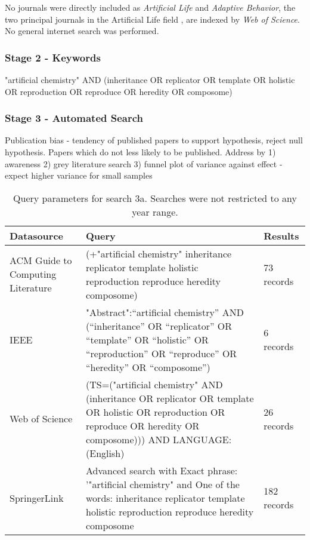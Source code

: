No journals were directly included as \textit{Artificial Life} and \textit{Adaptive Behavior}, the two principal journals in the Artificial Life field \cite{Aicardi2010}, are indexed by \textit{Web of Science}. No general internet search was performed. 

\subsubsection{Stage 2 - Keywords}

"artificial chemistry" AND (inheritance OR replicator OR template OR holistic OR reproduction OR reproduce OR heredity OR composome)

\subsubsection{Stage 3 - Automated Search}

Publication bias - tendency of published papers to support hypothesis, reject null hypothesis. Papers which do not less likely to be published. Address by 1) awareness 2) grey literature search 3) funnel plot of variance against effect - expect higher variance for small samples

\begin{table*}
	\footnotesize
	\begin{center}
		\begin{tabular}{@{}p{2cm}p{2cm}p{9cm}@{}}
			\toprule
			Datasource & Query & Results\\
			\midrule
			ACM Guide to Computing Literature & (+"artificial chemistry" inheritance replicator template holistic reproduction reproduce heredity composome)&73 records\\
			\midrule
			IEEE & "Abstract":“artificial chemistry” AND (“inheritance” OR “replicator” OR “template” OR “holistic” OR “reproduction” OR “reproduce” OR “heredity” OR “composome”)&6 records  \\
			\midrule
			Web of Science & (TS=("artificial chemistry" AND (inheritance OR replicator OR template OR holistic OR reproduction OR reproduce OR heredity OR composome))) AND LANGUAGE: (English)&26 records\\
			\midrule
			SpringerLink & Advanced search with Exact phrase: '"artificial chemistry" and One of the words: inheritance replicator template holistic reproduction reproduce heredity composome & 182 records\\ 
			\bottomrule
		\end{tabular}
	\end{center}
	\caption{Query parameters for search 3a. Searches were not restricted to any year range.}
\end{table*}

